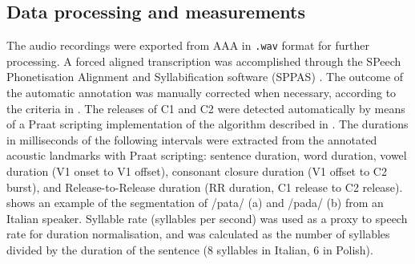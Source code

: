 \documentclass[preprint]{JASAnew}
\begin{document}
\hypertarget{data-processing-and-measurements}{%
\subsection{Data processing and
measurements}\label{data-processing-and-measurements}}


The audio recordings were exported from AAA in \texttt{.wav} format for
further processing. A forced aligned transcription was accomplished
through the SPeech Phonetisation Alignment and Syllabification software
(SPPAS) \citep{bigi2015}. The outcome of the automatic annotation was
manually corrected when necessary, according to the criteria in
. The releases of C1 and C2 were detected
automatically by means of a Praat scripting implementation of the
algorithm described in \citet{ananthapadmanabha2014}. The durations in
milliseconds of the following intervals were extracted from the
annotated acoustic landmarks with Praat scripting: sentence duration,
word duration, vowel duration (V1 onset to V1 offset), consonant closure
duration (V1 offset to C2 burst), and Release-to-Release duration (RR
duration, C1 release to C2 release).  shows an
example of the segmentation of /pata/ (a) and /pada/ (b) from an Italian
speaker. Syllable rate (syllables per second) was used as a proxy to
speech rate \citep{plug2018} for duration normalisation, and was
calculated as the number of syllables divided by the duration of the
sentence (8 syllables in Italian, 6 in Polish).
\end{document}
